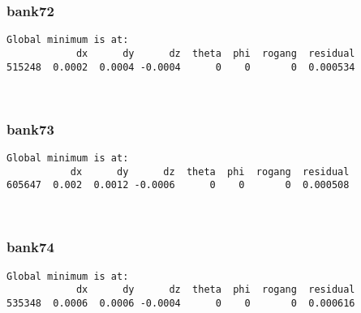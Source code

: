 \documentclass[11pt]{article}
\begin{document}
    \hypertarget{bank72}{%
\subsubsection{bank72}\label{bank72}}

    \begin{Verbatim}[commandchars=\\\{\}]
Global minimum is at:
            dx      dy      dz  theta  phi  rogang  residual
515248  0.0002  0.0004 -0.0004      0    0       0  0.000534
    \end{Verbatim}

    \begin{center}
    \end{center}
    { \hspace*{\fill} \\}
    
    \hypertarget{bank73}{%
\subsubsection{bank73}\label{bank73}}

    \begin{Verbatim}[commandchars=\\\{\}]
Global minimum is at:
           dx      dy      dz  theta  phi  rogang  residual
605647  0.002  0.0012 -0.0006      0    0       0  0.000508
    \end{Verbatim}

    \begin{center}
    \end{center}
    { \hspace*{\fill} \\}
    
    \hypertarget{bank74}{%
\subsubsection{bank74}\label{bank74}}

    \begin{Verbatim}[commandchars=\\\{\}]
Global minimum is at:
            dx      dy      dz  theta  phi  rogang  residual
535348  0.0006  0.0006 -0.0004      0    0       0  0.000616
    \end{Verbatim}
\end{document}
